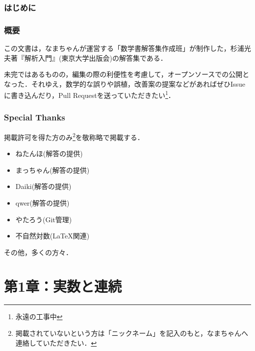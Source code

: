 \documentclass[a4paper,10pt,fleqn]{ltjsarticle}
\begin{document}


\thispagestyle{empty}

\newpage
{}
\pagecolor{white}

\begin{multicols}{3}
\tableofcontents
\end{multicols}

\newpage 

\section*{はじめに}


\section*{概要}

この文書は，なまちゃんが運営する「数学書解答集作成班」が制作した，杉浦光夫著『解析入門』(東京大学出版会)の解答集である．

未完ではあるものの，編集の際の利便性を考慮して，オープンソースでの公開となった．それゆえ，数学的な誤りや誤植，改善案の提案などがあればぜひIssueに書き込んだり，Pull Requestを送っていただきたい\footnote{永遠の工事中}．


\section*{Special Thanks}

掲載許可を得た方のみ\footnote{掲載されていないという方は「ニックネーム」を記入のもと，なまちゃんへ連絡していただきたい．}を敬称略で掲載する．
\begin{itemize}
    \item ねたんほ(解答の提供)
    \item まっちゃん(解答の提供)
    \item Daiki(解答の提供)
    \item qwer(解答の提供)
    \item やたろう(Git管理)
    \item 不自然対数(\LaTeX 関連)
\end{itemize}

その他，多くの方々．

\newpage 
\part*{第1章：実数と連続}
\end{document}
